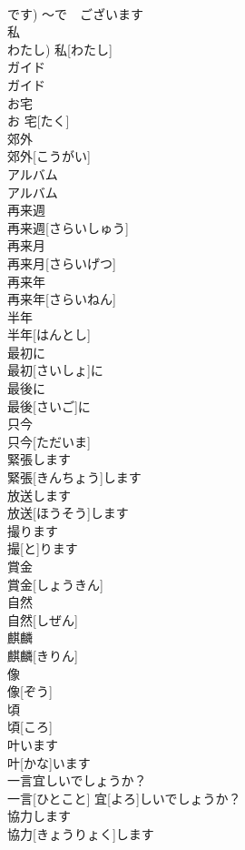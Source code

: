 \documentclass[8pt]{extreport}
\begin{document}
\begin{CJK}{UTF8}{min}
\\	です)	〜で　ございます	
\\	私
\\	わたし)	私[わたし]
\\	ガイド	
\\	ガイド	
\\	お宅	
\\	お 宅[たく]	
\\	郊外	
\\	郊外[こうがい]	
\\	アルバム	
\\	アルバム	
\\	再来週	
\\	再来週[さらいしゅう]	
\\	再来月	
\\	再来月[さらいげつ]	
\\	再来年	
\\	再来年[さらいねん]	
\\	半年	
\\	半年[はんとし]	
\\	最初に	
\\	最初[さいしょ]に	
\\	最後に	
\\	最後[さいご]に	
\\	只今	
\\	只今[ただいま]	
\\	緊張します	
\\	緊張[きんちょう]します	
\\	放送します	
\\	放送[ほうそう]します	
\\	撮ります	
\\	撮[と]ります	
\\	賞金	
\\	賞金[しょうきん]	
\\	自然	
\\	自然[しぜん]	
\\	麒麟	
\\	麒麟[きりん]	
\\	像	
\\	像[ぞう]	
\\	頃	
\\	頃[ころ]	
\\	叶います	
\\	叶[かな]います	
\\	一言宜しいでしょうか？	
\\	一言[ひとこと] 宜[よろ]しいでしょうか？	
\\	協力します	
\\	協力[きょうりょく]します	

\end{CJK}
\end{document}
